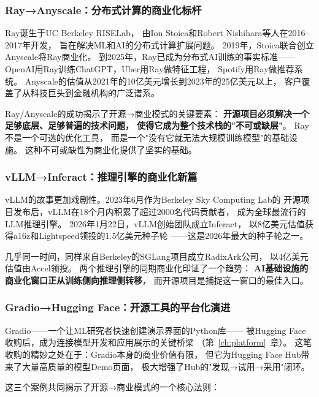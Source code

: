 \subsubsection{Ray→Anyscale：分布式计算的商业化标杆}
Ray诞生于UC Berkeley RISELab，
由Ion Stoica和Robert Nishihara等人在2016--2017年开发，
旨在解决ML和AI的分布式计算扩展问题。
2019年，Stoica联合创立Anyscale将Ray商业化。
到2025年，Ray已成为分布式AI训练的事实标准——
OpenAI用Ray训练ChatGPT，Uber用Ray做特征工程，
Spotify用Ray做推荐系统。
Anyscale的估值从2021年的10亿美元增长到2023年的25亿美元以上，
客户覆盖了从科技巨头到金融机构的广泛谱系。

Ray/Anyscale的成功揭示了开源→商业模式的关键要素：
\textbf{开源项目必须解决一个足够底层、足够普遍的技术问题，
使得它成为整个技术栈的"不可或缺层"}。
Ray不是一个可选的优化工具，
而是一个"没有它就无法大规模训练模型"的基础设施。
这种不可或缺性为商业化提供了坚实的基础。

\subsubsection{vLLM→Inferact：推理引擎的商业化新篇}
vLLM的故事更加戏剧性。2023年6月作为Berkeley Sky Computing Lab的
开源项目发布后，vLLM在18个月内积累了超过2000名代码贡献者，
成为全球最流行的LLM推理引擎。
2026年1月22日，vLLM创始团队成立Inferact，
以8亿美元估值获得a16z和Lightspeed领投的1.5亿美元种子轮
——这是2026年最大的种子轮之一。

几乎同一时间，同样来自Berkeley的SGLang项目成立RadixArk公司，
以4亿美元估值由Accel领投。
两个推理引擎的同期商业化印证了一个趋势：
\textbf{AI基础设施的商业化窗口正从训练侧向推理侧转移}，
而开源项目是捕捉这一窗口的最佳入口。

\subsubsection{Gradio→Hugging Face：开源工具的平台化演进}
Gradio——一个让ML研究者快速创建演示界面的Python库——
被Hugging Face收购后，成为连接模型开发和应用展示的关键桥梁
（第~\ref{ch:platform}~章）。
这笔收购的精妙之处在于：Gradio本身的商业价值有限，
但它为Hugging Face Hub带来了大量高质量的模型Demo页面，
极大增强了Hub的"发现→试用→采用"闭环。

这三个案例共同揭示了开源→商业模式的一个核心法则：

